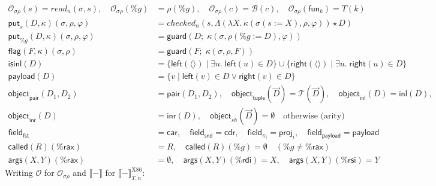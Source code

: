 \documentclass[10pt]{article}
\theoremstyle{acmplain}
\newcommand{\SEM}[1]{\llbracket #1 \rrbracket}
\newcommand{\key}[1]{\mathsf{#1}}
\newcommand{\funref}[1]{\key{fun}_{#1}}
\newcommand{\Left}[1]{\key{left}(#1)}
\newcommand{\Right}[1]{\key{right}(#1)}
\newcommand{\emptytup}{\langle\rangle}
\newcommand{\ext}[3]{#1(#2{:=}#3)}
\newcommand{\app}{\star}
\newcommand{\rax}{\%\key{rax}}
\newcommand{\rdi}{\%\key{rdi}}
\newcommand{\rsi}{\%\key{rsi}}
\begin{document}
\begin{align*}
  \mathcal{O}_{\sigma\rho}(s) = \mathit{read}_n(\sigma, s), \quad
  \mathcal{O}_{\sigma\rho}(\%g) &= \rho(\%g), \quad
  \mathcal{O}_{\sigma\rho}(c) = \mathcal{B}(c), \quad
  \mathcal{O}_{\sigma\rho}(\funref{k}) = T(k) \\[1ex]
  \key{put}_s(D, \kappa)(\sigma, \rho, \varphi) &=
    \mathit{checked}_n(s, \Lambda(\lambda X.\, \kappa(\ext{\sigma}{s}{X}, \rho, \varphi)) \app D) \\
  \key{put}_{\%g}(D, \kappa)(\sigma, \rho, \varphi) &=
    \key{guard}(D;\; \kappa(\sigma, \ext{\rho}{\%g}{D}, \varphi)) \\
  \key{flag}(F, \kappa)(\sigma, \rho) &= \key{guard}(F;\; \kappa(\sigma, \rho, F)) \\[1ex]
  \key{isinl}(D) &= \{ \Left{\emptytup} \mid \exists u.\; \Left{u} \in D \}
    \cup \{ \Right{\emptytup} \mid \exists u.\; \Right{u} \in D \} \\
  \key{payload}(D) &= \{ v \mid \Left{v} \in D \lor \Right{v} \in D \} \\
  \key{object}_{\key{pair}}(D_1, D_2) &= \key{pair}(D_1, D_2), \quad
  \key{object}_{\key{tuple}}(\vec{D}) = \mathcal{T}(\vec{D}), \quad
  \key{object}_{\key{inl}}(D) = \key{inl}(D), \\
  \key{object}_{\key{inr}}(D) &= \key{inr}(D), \quad
  \key{object}_{\mathit{sh}}(\vec{D}) = \emptyset \quad \text{otherwise (arity)} \\
  \key{field}_{\key{fst}} &= \key{car}, \quad
  \key{field}_{\key{snd}} = \key{cdr}, \quad
  \key{field}_{\pi_i} = \key{proj}_i, \quad
  \key{field}_{\key{payload}} = \key{payload} \\[1ex]
  \key{called}(R)(\rax) &= R, \quad \key{called}(R)(\%g) = \emptyset \quad (\%g \neq \rax) \\
  \key{args}(X, Y)(\rax) &= \emptyset, \quad \key{args}(X, Y)(\rdi) = X, \quad \key{args}(X, Y)(\rsi) = Y
\end{align*}
Writing $\mathcal{O}$ for $\mathcal{O}_{\sigma\rho}$ and $\SEM{-}$ for $\SEM{-}^{\mathrm{X86}}_{T,n}$:
\end{document}
